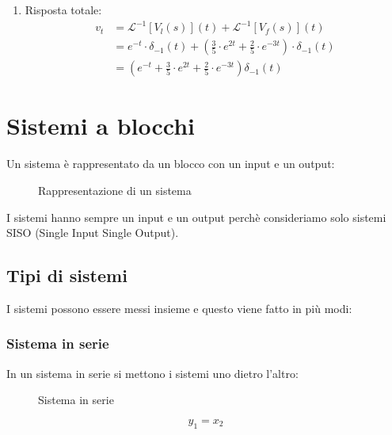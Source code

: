 \documentclass[a4paper]{article}
\begin{document}
\begin{example}
\begin{enumerate}
    \item Risposta totale:
      \[
        \begin{aligned}
          v_t &= \mathcal{L}^{-1}\left[V_l(s)\right](t) + \mathcal{L}^{-1}\left[V_f(s)\right](t)\\
              &= e^{-t} \cdot \delta_{-1}(t) + \left( \frac{3}{5} \cdot e^{2t} + \frac{2}{5} \cdot e^{-3t} \right) \cdot \delta_{-1}(t)\\
              &= \left( e^{-t} + \frac{3}{5} \cdot e^{2t} + \frac{2}{5} \cdot e^{-3t} \right) \delta_{-1}(t) 
        \end{aligned}
      \] 
  \end{enumerate}
\end{example}

\section{Sistemi a blocchi}
Un sistema è rappresentato da un blocco con un input e un output:
\begin{figure}[H]
  \centering
  \caption{Rappresentazione di un sistema}
\end{figure}

\noindent
I sistemi hanno sempre un input e un output perchè consideriamo solo sistemi SISO
(Single Input Single Output).

\subsection{Tipi di sistemi}
I sistemi possono essere messi insieme e questo viene fatto in più modi:
\subsubsection{Sistema in serie}
In un sistema in serie si mettono i sistemi uno dietro l'altro:
\begin{figure}[H]
  \centering
  \caption{Sistema in serie}
\end{figure}
\[
  y_1 = x_2
\] 
\end{document}
